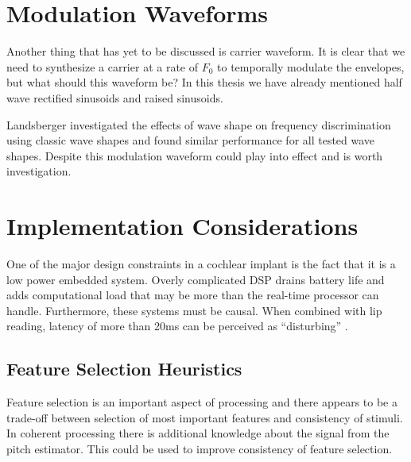 \documentclass [11pt, proquest,oneside] {ganter_thesis}[2015/03/03]
\begin{document}
\section{Modulation Waveforms}
Another thing that has yet to be discussed is carrier waveform.  It is clear that we need to synthesize a carrier at a rate of $F_0$ to temporally modulate the envelopes, but what should this waveform be?  In this thesis we have already mentioned half wave rectified sinusoids and raised sinusoids.

Landsberger \cite{landsberger2008effects} investigated the effects of wave shape on frequency discrimination using classic wave shapes and found similar performance for all tested wave shapes.  Despite this modulation waveform could play into effect and is worth investigation.




\section{Implementation Considerations}

One of the major design constraints in a cochlear implant is the fact that it is a low power embedded system.  Overly complicated DSP drains battery life and adds computational load that may be more than the real-time processor can handle.  Furthermore, these systems must be causal.  When combined with lip reading, latency of more than 20ms can be perceived as ``disturbing'' \cite{stone2002tolerable}.

\subsection{Feature Selection Heuristics}

Feature selection is an important aspect of processing and there appears to be a trade-off between selection of most important features and consistency of stimuli.  In coherent processing there is additional knowledge about the signal from the pitch estimator.  This could be used to improve consistency of feature selection.
\end{document}
